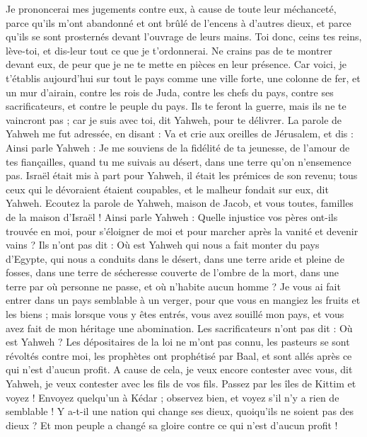 \begin{multicols}{2}
Je prononcerai mes jugements contre eux, à cause de toute leur méchanceté, parce qu’ils m’ont abandonné et ont brûlé de l’encens à d'autres dieux, et parce qu’ils se sont prosternés devant l'ouvrage de leurs mains.
Toi donc, ceins tes reins, lève-toi, et dis-leur tout ce que je t’ordonnerai. Ne crains pas de te montrer devant eux, de peur que je ne te mette en pièces en leur présence.
Car voici, je t'établis aujourd'hui sur tout le pays comme une ville forte, une colonne de fer, et un mur d'airain, contre les rois de Juda, contre les chefs du pays, contre ses sacrificateurs, et contre le peuple du pays.
Ils te feront la guerre, mais ils ne te vaincront pas ; car je suis avec toi, dit Yahweh, pour te délivrer.
\VerseOne{}La parole de Yahweh me fut adressée, en disant :
Va et crie aux oreilles de Jérusalem, et dis : Ainsi parle Yahweh : Je me souviens de la fidélité de ta jeunesse, de l'amour de tes fiançailles, quand tu me suivais au désert, dans une terre qu’on n’ensemence pas.
Israël était mis à part pour Yahweh, il était les prémices de son revenu; tous ceux qui le dévoraient étaient coupables, et le malheur fondait sur eux, dit Yahweh.
Ecoutez la parole de Yahweh, maison de Jacob, et vous toutes, familles de la maison d'Israël !
Ainsi parle Yahweh : Quelle injustice vos pères ont-ils trouvée en moi, pour s’éloigner de moi et pour marcher après la vanité et devenir vains ?
Ils n'ont pas dit : Où est Yahweh qui nous a fait monter du pays d'Egypte, qui nous a conduits dans le désert, dans une terre aride et pleine de fosses, dans une terre de sécheresse couverte de l’ombre de la mort, dans une terre par où personne ne passe, et où n’habite aucun homme ?
Je vous ai fait entrer dans un pays semblable à un verger, pour que vous en mangiez les fruits et les biens ; mais lorsque vous y êtes entrés, vous avez souillé mon pays, et vous avez fait de mon héritage une abomination.
Les sacrificateurs n'ont pas dit : Où est Yahweh ? Les dépositaires de la loi ne m'ont pas connu, les pasteurs se sont révoltés contre moi, les prophètes ont prophétisé par Baal, et sont allés après ce qui n’est d’aucun profit.
A cause de cela, je veux encore contester avec vous, dit Yahweh, je veux contester avec les fils de vos fils.
Passez par les îles de Kittim et voyez ! Envoyez quelqu’un à Kédar ; observez bien, et voyez s’il n’y a rien de semblable !
Y a-t-il une nation qui change ses dieux, quoiqu’ils ne soient pas des dieux ? Et mon peuple a changé sa gloire contre ce qui n’est d’aucun profit !

\end{multicols}
